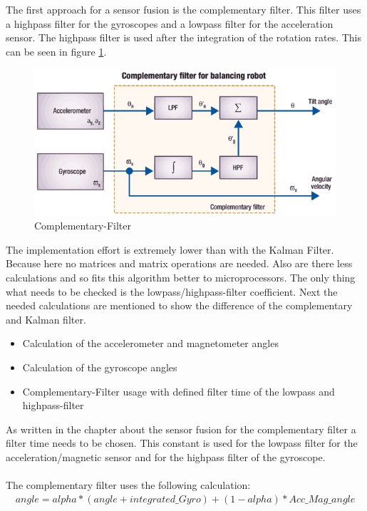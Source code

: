 The first approach for a sensor fusion is the complementary filter. This filter uses a highpass filter for the gyroscopes and a lowpass filter for the acceleration sensor. The highpass filter is used after the integration of the rotation rates. This can be seen in figure \ref{fig:complementary}.\\
\begin{figure}[H]
	\centering\includegraphics[width=1\textwidth]{fig/Kal_Comp/Complementary.jpg}
	\caption{Complementary-Filter\cite{doc:STM}}
	\label{fig:complementary}
\end{figure}
The implementation effort is extremely lower than with the Kalman Filter. Because here no matrices and matrix operations are needed. Also are there less calculations and so fits this algorithm better to microprocessors. The only thing what needs to be checked is the lowpass/highpass-filter coefficient. Next the needed calculations are mentioned to show the difference of the complementary and Kalman filter.
\begin{itemize}
	\item Calculation of the accelerometer and magnetometer angles
	\item Calculation of the gyroscope angles
	\item Complementary-Filter usage with defined filter time of the lowpass and highpass-filter
\end{itemize}

As written in the chapter about the sensor fusion for the complementary filter a filter time needs to be chosen. This constant is used for the lowpass filter for the acceleration/magnetic sensor and for the highpass filter of the gyroscope. \\\\
The complementary filter uses the following calculation:
\begin{align}
angle=alpha*(angle+integrated\_Gyro)+(1-alpha)*Acc\_Mag\_angle
\label{equ:Comp1}
\end{align}

